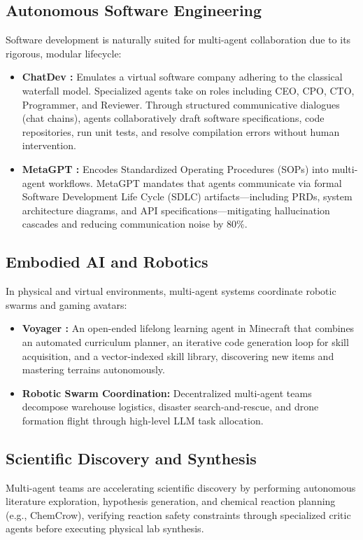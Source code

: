 \documentclass[12pt,a4paper]{report}
\begin{document}
\subsection{Autonomous Software Engineering}
Software development is naturally suited for multi-agent collaboration due to its rigorous, modular lifecycle:
\begin{itemize}
    \item \textbf{ChatDev \cite{qian2023communicative}:} Emulates a virtual software company adhering to the classical waterfall model. Specialized agents take on roles including CEO, CPO, CTO, Programmer, and Reviewer. Through structured communicative dialogues (chat chains), agents collaboratively draft software specifications, code repositories, run unit tests, and resolve compilation errors without human intervention.
    \item \textbf{MetaGPT \cite{hong2023metagpt}:} Encodes Standardized Operating Procedures (SOPs) into multi-agent workflows. MetaGPT mandates that agents communicate via formal Software Development Life Cycle (SDLC) artifacts---including PRDs, system architecture diagrams, and API specifications---mitigating hallucination cascades and reducing communication noise by $80\%$.
\end{itemize}

\subsection{Embodied AI and Robotics}
In physical and virtual environments, multi-agent systems coordinate robotic swarms and gaming avatars:
\begin{itemize}
    \item \textbf{Voyager \cite{wang2023voyager}:} An open-ended lifelong learning agent in Minecraft that combines an automated curriculum planner, an iterative code generation loop for skill acquisition, and a vector-indexed skill library, discovering new items and mastering terrains autonomously.
    \item \textbf{Robotic Swarm Coordination:} Decentralized multi-agent teams decompose warehouse logistics, disaster search-and-rescue, and drone formation flight through high-level LLM task allocation.
\end{itemize}

\subsection{Scientific Discovery and Synthesis}
Multi-agent teams are accelerating scientific discovery by performing autonomous literature exploration, hypothesis generation, and chemical reaction planning (e.g., ChemCrow), verifying reaction safety constraints through specialized critic agents before executing physical lab synthesis.
\end{document}
